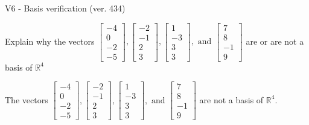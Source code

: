 \begin{exercise}
  \begin{exerciseTitle}V6 - Basis verification (ver. 434)\end{exerciseTitle}
  \begin{exerciseStatement}
    Explain why the vectors \(\left[\begin{array}{r}
-4 \\
0 \\
-2 \\
-5
\end{array}\right] , \left[\begin{array}{r}
-2 \\
-1 \\
2 \\
3
\end{array}\right] , \left[\begin{array}{r}
1 \\
-3 \\
3 \\
3
\end{array}\right] , \text{ and } \left[\begin{array}{r}
7 \\
8 \\
-1 \\
9
\end{array}\right]\) are or are not a basis of \(\mathbb{R}^4\)	


  \end{exerciseStatement}
  \begin{exerciseAnswer}
   The vectors \(\left[\begin{array}{r}
-4 \\
0 \\
-2 \\
-5
\end{array}\right] , \left[\begin{array}{r}
-2 \\
-1 \\
2 \\
3
\end{array}\right] , \left[\begin{array}{r}
1 \\
-3 \\
3 \\
3
\end{array}\right] , \text{ and } \left[\begin{array}{r}
7 \\
8 \\
-1 \\
9
\end{array}\right]\) 
  	 are not  a basis of \(\mathbb{R}^4\).
  


  \end{exerciseAnswer}
\end{exercise}